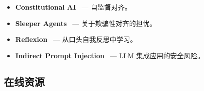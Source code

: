 \begin{itemize}
  \item \textbf{Constitutional AI}~\cite{bai2022constitutional} --- 自监督对齐。
  \item \textbf{Sleeper Agents}~\cite{hubinger2024sleeper} --- 关于欺骗性对齐的担忧。
  \item \textbf{Reflexion}~\cite{shinn2023reflexion} --- 从口头自我反思中学习。
  \item \textbf{Indirect Prompt Injection}~\cite{greshake2023indirect} --- LLM 集成应用的安全风险。
\end{itemize}

\subsection{在线资源}
\label{online-resources}

